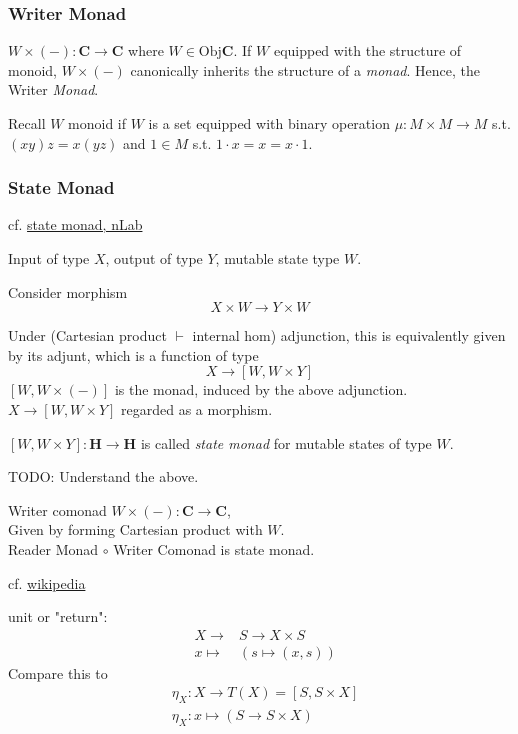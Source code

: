 \subsubsection{Writer Monad} $W \times (-) : \mathbf{C} \to \mathbf{C}$ where $W \in \text{Obj}{\mathbf{C}}$. If $W$ equipped with the structure of monoid, $W \times (-)$ canonically inherits the structure of a \emph{monad}. Hence, the Writer \emph{Monad}.  

Recall $W$ monoid if $W$ is a set equipped with binary operation $\mu : M \times M \to M$ s.t. $(xy)z = x(yz)$ and $1 \in M$ s.t. $1\cdot x = x = x \cdot 1$. \\

\subsubsection{State Monad}

cf. \href{https://ncatlab.org/nlab/show/state+monad}{state monad, nLab}

Input of type $X$, output of type $Y$, mutable state type $W$.

Consider morphism 
\[
X\times W \to Y\times W
\]

Under (Cartesian product $\vdash$ internal hom) adjunction, this is equivalently given by its adjunt, which is a function of type
\[
X \to [W, W\times Y]
\]
$[W, W\times (-)]$ is the monad, induced by the above adjunction. \\

$X \to [W, W\times Y]$ regarded as a morphism.

$[W, W\times Y]:\mathbf{H} \to \mathbf{H}$ is called \emph{state monad} for mutable states of type $W$.

TODO: Understand the above.

Writer comonad $W \times (-):\mathbf{C} \to \mathbf{C}$, \\

Given by forming Cartesian product with $W$. \\

Reader Monad $\circ$ Writer Comonad is state monad.

cf. \href{https://en.wikipedia.org/wiki/Monad_(functional_programming)#State_monads}{wikipedia}

unit or "return":
\begin{equation}\label{agat:Eq:ReturnStateMonadWikipedia}
\begin{aligned}
& X \to & S \to X \times S \\
& x \mapsto & (s \mapsto (x, s))
\end{aligned}
\end{equation} 
Compare this to 
\[
\begin{aligned} 
	& \eta_X : X \to T(X) = [S, S \times X] \\ 
	& \eta_X : x \mapsto (S \to S \times X)
\end{aligned} 
\]

